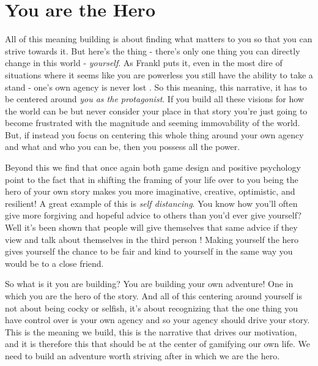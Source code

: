 \documentclass[11pt,a5paper]{book}
\begin{document}
\section{You are the Hero}
All of this meaning building is about finding what matters to you so that you can strive towards it. But here's the thing - there's only one thing you can directly change in this world - \textit{yourself}. As Frankl puts it, even in the most dire of situations where it seems like you are powerless you still have the ability to take a stand - one's own agency is never lost \cite{frankl}. So this meaning, this narrative, it has to be centered around \textit{you as the protagonist}. If you build all these visions for how the world can be but never consider your place in that story you're just going to become frustrated with the magnitude and seeming immovability of the world. But, if instead you focus on centering this whole thing around your own agency and what and who you can be, then you possess all the power. 
\newline

Beyond this we find that once again both game design \cite{superbetter} and positive psychology \cite{seligman} point to the fact that in shifting the framing of your life over to you being the hero of your own story makes you more imaginative, creative, optimistic, and resilient! A great example of this is \textit{self distancing}. You know how you'll often give more forgiving and hopeful advice to others than you'd ever give yourself? Well it's been shown that people will give themselves that same advice if they view and talk about themselves in the third person \cite{superbetter}! Making yourself the hero gives yourself the chance to be fair and kind to yourself in the same way you would be to a close friend.
\newline

So what is it you are building? You are building your own adventure! One in which you are the hero of the story. And all of this centering around yourself is not about being cocky or selfish, it's about recognizing that the one thing you have control over is your own agency and so your agency should drive your story. This is the meaning we build, this is the narrative that drives our motivation, and it is therefore this that should be at the center of gamifying our own life. We need to build an adventure worth striving after in which we are the hero. 
\newline
\end{document}
